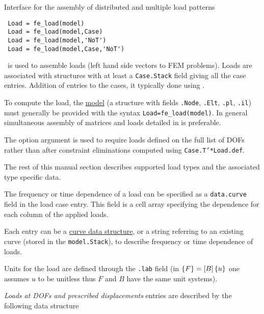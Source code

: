 

Interface for the assembly of distributed and multiple load patterns

\rsyntax
\begin{verbatim}
 Load = fe_load(model)
 Load = fe_load(model,Case)
 Load = fe_load(model,'NoT')
 Load = fe_load(model,Case,'NoT')
\end{verbatim}



\feload\ is used to assemble loads (left hand side vectors to FEM problems). Loads are associated with  structures with at least a {\tt Case.Stack} field giving all the case entries. Addition of entries to the cases, it typically done using \fecase.

To compute the load, the \hyperlink{model}{model} (a structure with fields {\tt .Node}, {\tt .Elt}, {\tt .pl}, {\tt .il}) must generally be provided with the syntax {\tt Load=fe\_load(model)}. In general simultaneous assembly of matrices and loads  detailed in  is preferable. 

The option  argument is used to require loads defined on the full list of DOFs rather than after constraint eliminations computed using {\tt Case.T'*Load.def}.  

The rest of this manual section describes supported load types and the associated type specific data.


The frequency or time dependence of a load can be specified as a {\tt data.curve} field in the load case entry. This field is a cell array specifying the dependence for each column of the applied loads. 

Each entry can be a \hyperlink{curve}{curve data structure}, or a string referring to an existing curve (stored in the {\tt model.Stack}), to describe frequency or time dependence of loads. 

Units for the load are defined through the {\tt .lab} field (in $\left\{F\right\}=\left[B\right]\left\{u\right\}$ one assumes $u$ to be unitless thus $F$ and $B$ have the same unit systems).


{\sl Loads at DOFs  and prescribed displacements } entries are described by the following data structure


